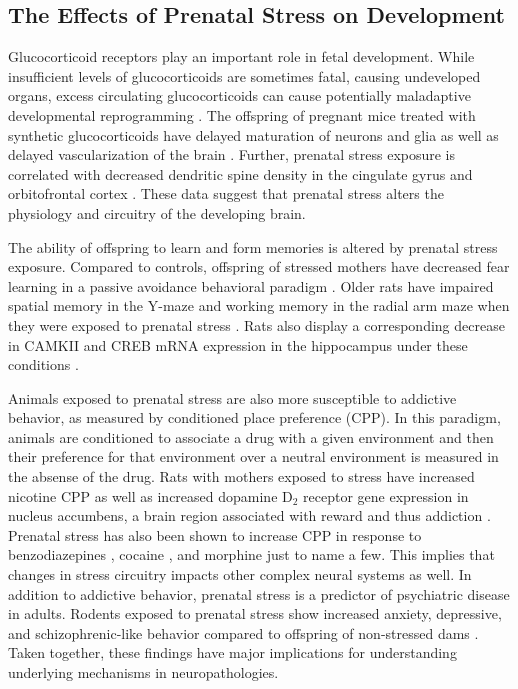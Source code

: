 \documentclass[12pt,twoside]{reedthesis}
\begin{document}
\subsection{The Effects of Prenatal Stress on Development}
Glucocorticoid receptors play an important role in fetal development. While
insufficient levels of glucocorticoids are sometimes fatal, causing undeveloped organs,
excess circulating glucocorticoids can cause potentially maladaptive developmental
reprogramming \citep{2017Nrid}. The offspring of pregnant mice treated with synthetic glucocorticoids
 have delayed maturation of neurons and glia as well as delayed vascularization
 of the brain \citep{gravanis_hormones_2011}. Further, prenatal stress exposure is correlated with
 decreased dendritic spine density in the cingulate gyrus and orbitofrontal
 cortex \citep{murmu_changes_2006}. These data suggest that prenatal stress alters the
 physiology and circuitry of the developing brain.

 The ability of offspring to learn and form memories is altered by prenatal
 stress exposure. Compared to controls, offspring of stressed mothers have decreased fear learning in a
 passive avoidance behavioral paradigm \citep{sofiabadi_effects_2018}. Older rats have impaired spatial memory in the Y-maze and
 working memory in the radial arm maze when they were exposed to prenatal stress
 \citep{vallee_long-term_1999}. Rats also display a corresponding
 decrease in CAMKII and CREB mRNA expression in the hippocampus under these
 conditions \citep{sun_prenatal_2017}. 

 Animals exposed to prenatal stress are also more susceptible to addictive
 behavior, as measured by conditioned place preference (CPP). In this paradigm,
 animals are conditioned to associate a drug with a given environment and then
 their preference for that environment over a neutral environment is measured in
 the absense of the drug.
 Rats with mothers exposed to stress have increased nicotine CPP as well as increased dopamine D$_2$ receptor gene expression
 in nucleus accumbens, a brain region associated with reward and thus addiction \citep{said_prenatal_2015}. Prenatal stress has also been shown to
 increase CPP in response to benzodiazepines \citep{lakehayli_prenatal_2015}, cocaine
 \citep{pastor_prenatal_2018}, and morphine \citep{vey_stress_2016} just to name
 a few. This implies that changes in stress circuitry impacts other complex
 neural systems as well. In addition to addictive behavior, prenatal stress is a predictor of psychiatric disease in adults.
 Rodents exposed to prenatal stress show increased anxiety, depressive, and
 schizophrenic-like behavior compared to offspring of non-stressed dams
 \citep{weinstock_prenatal_2017}. Taken together, these findings have major
 implications for understanding underlying mechanisms in neuropathologies.
\end{document}
